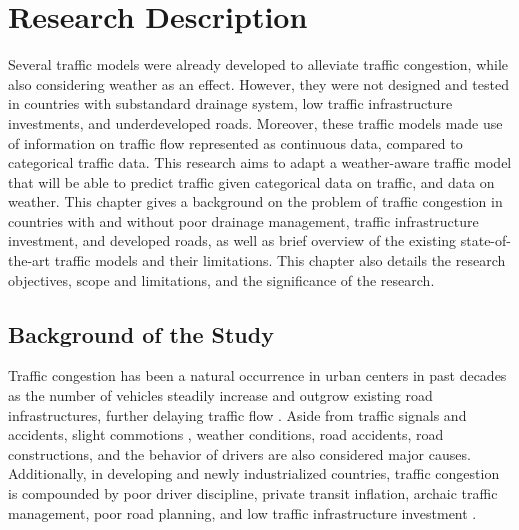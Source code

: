 \chapter{Research Description}
\label{sec:researchdesc}

Several traffic models were already developed to alleviate traffic congestion, while also considering weather as an effect. However, they were not designed and tested in countries with substandard drainage system, low traffic infrastructure investments, and underdeveloped roads. Moreover, these traffic models made use of information on traffic flow represented as continuous data, compared to categorical traffic data. This research aims to adapt a weather-aware traffic model that will be able to predict traffic given categorical data on traffic, and data on weather. This chapter gives a background on the problem of traffic congestion in countries with and without poor drainage management, traffic infrastructure investment, and developed roads, as well as brief overview of the existing state-of-the-art traffic models and their limitations. This chapter also details the research objectives, scope and limitations, and the significance of the research.




\section{Background of the Study}
\label{sec:overview}

Traffic congestion has been a natural occurrence in urban centers in past decades  as the number of vehicles steadily increase and outgrow existing road infrastructures, further delaying traffic flow . Aside from traffic signals and accidents, slight commotions , weather conditions, road accidents, road constructions, and the behavior of drivers  are also considered major causes. Additionally, in developing and newly industrialized countries, traffic congestion is compounded by poor driver discipline, private transit inflation, archaic traffic management, poor road planning, and low traffic infrastructure investment .

